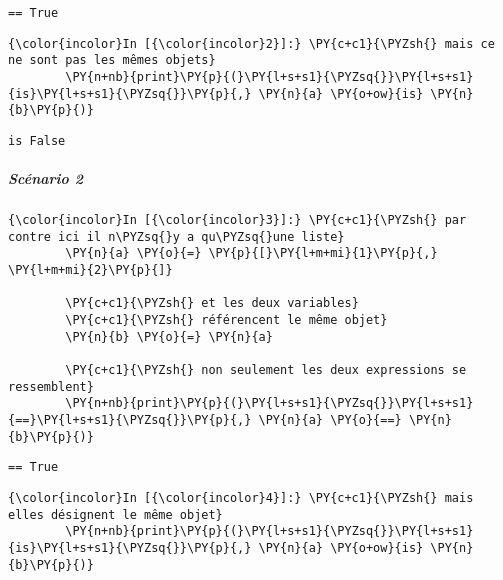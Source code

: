     \begin{Verbatim}[commandchars=\\\{\}]
== True

    \end{Verbatim}

    \begin{Verbatim}[commandchars=\\\{\}]
{\color{incolor}In [{\color{incolor}2}]:} \PY{c+c1}{\PYZsh{} mais ce ne sont pas les mêmes objets}
        \PY{n+nb}{print}\PY{p}{(}\PY{l+s+s1}{\PYZsq{}}\PY{l+s+s1}{is}\PY{l+s+s1}{\PYZsq{}}\PY{p}{,} \PY{n}{a} \PY{o+ow}{is} \PY{n}{b}\PY{p}{)}
\end{Verbatim}


    \begin{Verbatim}[commandchars=\\\{\}]
is False

    \end{Verbatim}

    \hypertarget{scuxe9nario-2}{%
\subparagraph{Scénario 2}\label{scuxe9nario-2}}

    \begin{Verbatim}[commandchars=\\\{\}]
{\color{incolor}In [{\color{incolor}3}]:} \PY{c+c1}{\PYZsh{} par contre ici il n\PYZsq{}y a qu\PYZsq{}une liste}
        \PY{n}{a} \PY{o}{=} \PY{p}{[}\PY{l+m+mi}{1}\PY{p}{,} \PY{l+m+mi}{2}\PY{p}{]}
        
        \PY{c+c1}{\PYZsh{} et les deux variables}
        \PY{c+c1}{\PYZsh{} référencent le même objet}
        \PY{n}{b} \PY{o}{=} \PY{n}{a}
        
        \PY{c+c1}{\PYZsh{} non seulement les deux expressions se ressemblent}
        \PY{n+nb}{print}\PY{p}{(}\PY{l+s+s1}{\PYZsq{}}\PY{l+s+s1}{==}\PY{l+s+s1}{\PYZsq{}}\PY{p}{,} \PY{n}{a} \PY{o}{==} \PY{n}{b}\PY{p}{)}
\end{Verbatim}


    \begin{Verbatim}[commandchars=\\\{\}]
== True

    \end{Verbatim}

    \begin{Verbatim}[commandchars=\\\{\}]
{\color{incolor}In [{\color{incolor}4}]:} \PY{c+c1}{\PYZsh{} mais elles désignent le même objet}
        \PY{n+nb}{print}\PY{p}{(}\PY{l+s+s1}{\PYZsq{}}\PY{l+s+s1}{is}\PY{l+s+s1}{\PYZsq{}}\PY{p}{,} \PY{n}{a} \PY{o+ow}{is} \PY{n}{b}\PY{p}{)}
\end{Verbatim}


